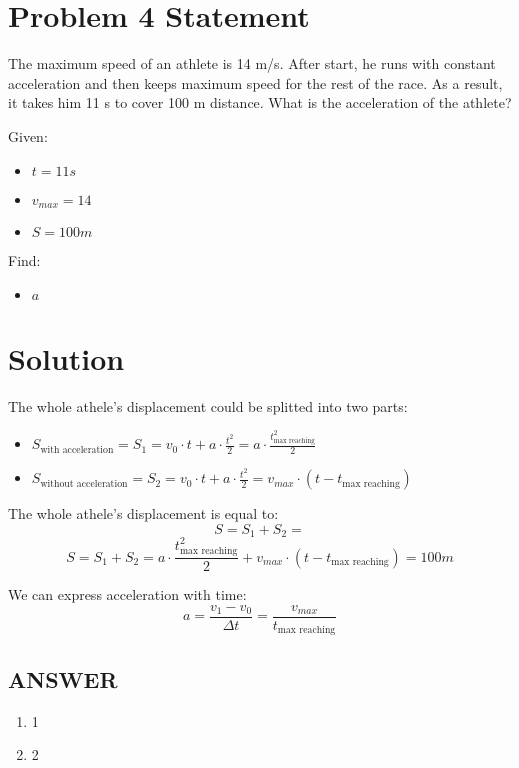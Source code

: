 \section*{Problem 4 Statement}

The maximum speed of an athlete is 14 m/s. After start, he runs with constant acceleration and
then keeps maximum speed for the rest of the race. As a result, it takes him 11 s to cover 100 m
distance. What is the acceleration of the athlete?

\bigbreak Given:

\begin{itemize}
    \item $t = 11s$
    \item $v_{max} = 14$
    \item $S = 100m$
\end{itemize}

\bigbreak Find:

\begin{itemize}
    \item $a$
\end{itemize}

\section*{Solution}

The whole athele's displacement could be splitted into two parts:

\begin{itemize}
    \item $S_{\text{with acceleration}} = S_1 = v_0 \cdot t + a \cdot \frac{t^2}{2} = a \cdot \frac{t_{\text{max reaching}}^2}{2}$
    \item $ S_{\text{without acceleration}} = S_2 = v_0 \cdot t + a \cdot \frac{t^2}{2} = v_{max} \cdot (t - t_{\text{max reaching}})$
\end{itemize}

The whole athele's displacement is equal to:
\begin{equation}
    S = S_1 + S_2 =
\end{equation}
$$ S = S_1 + S_2 = a \cdot \frac{t_{\text{max reaching}}^2}{2} + v_{max} \cdot (t - t_{\text{max reaching}}) = 100m $$

We can express acceleration with time:
$$a = \frac{v_1 - v_0}{\Delta t} = \frac{v_{max}}{t_{\text{max reaching}}}$$


\vfill \subsection*{ANSWER}
\begin{enumerate}
    \item 1
    \item 2
\end{enumerate}

